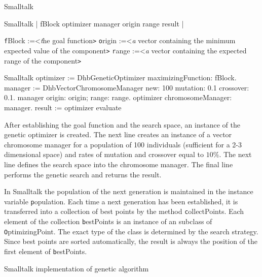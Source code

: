 \begin{displaycode}{Smalltalk}
\begin{displaycode}{Smalltalk}
    | fBlock optimizer manager origin range result |
\end{displaycode}
 {\texttt fBlock :=<\textsl the goal function\texttt >}\hfil\break
 {\texttt origin :=<\textsl a vector containing the minimum expected value of the component\texttt >}\hfil\break
 {\texttt range :=<\textsl a vector containing the expected range of the component\texttt >}\hfil\break
\begin{displaycode}{Smalltalk}
    optimizer := DhbGeneticOptimizer maximizingFunction: fBlock.
    manager := DhbVectorChromosomeManager new: 100 mutation: 0.1 crossover: 0.1.
    manager origin: origin; range: range.
    optimizer chromosomeManager: manager.
    result := optimizer evaluate
\end{displaycode}
After establishing the goal function and the search space, an
instance of the genetic optimizer is created. The next line
creates an instance of a vector chromosome manager for a
population of 100 individuals (sufficient for a 2-3 dimensional
space) and rates of mutation and crossover equal to $10\%$. The
next line defines the search space into the chromosome manager.
The final line performs the genetic search and returns the result.

In Smalltalk the population of the next generation is maintained
in the instance variable {\texttt population}. Each time a next
generation has been established, it is transferred into a
collection of best points by the method {\texttt collectPoints}. Each
element of the collection {\texttt bestPoints} is an instance of an
subclass of {\texttt OptimizingPoint}. The exact type of the class is
determined by the search strategy. Since best points are sorted
automatically, the result is always the position of the first
element of  {\texttt bestPoints}.

\begin{listing} Smalltalk implementation of genetic algorithm \label{ls:optimizerabsgen}

\end{listing}



\end{displaycode}
